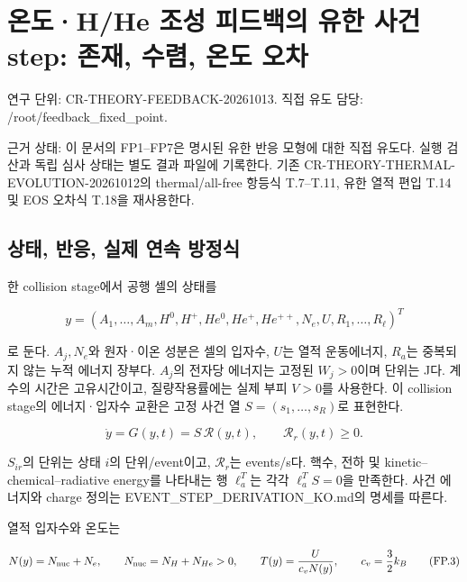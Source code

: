 \hypertarget{uxc628uxb3c4hhe-uxc870uxc131-uxd53cuxb4dcuxbc31uxc758-uxc720uxd55c-uxc0acuxac74-step-uxc874uxc7ac-uxc218uxb834-uxc628uxb3c4-uxc624uxcc28}{%
\section{온도·H/He 조성 피드백의 유한 사건 step: 존재, 수렴, 온도 오차}\label{uxc628uxb3c4hhe-uxc870uxc131-uxd53cuxb4dcuxbc31uxc758-uxc720uxd55c-uxc0acuxac74-step-uxc874uxc7ac-uxc218uxb834-uxc628uxb3c4-uxc624uxcc28}}

연구 단위: CR-THEORY-FEEDBACK-20261013. 직접 유도 담당: /root/feedback\_fixed\_point.

근거 상태: 이 문서의 FP1--FP7은 명시된 유한 반응 모형에 대한 직접 유도다. 실행 검산과 독립 심사 상태는 별도 결과 파일에 기록한다. 기존 CR-THEORY-THERMAL-EVOLUTION-20261012의 thermal/all-free 항등식 T.7--T.11, 유한 열적 편입 T.14 및 EOS 오차식 T.18을 재사용한다.

\hypertarget{uxc0c1uxd0dc-uxbc18uxc751-uxc2e4uxc81c-uxc5f0uxc18d-uxbc29uxc815uxc2dd}{%
\subsection{상태, 반응, 실제 연속 방정식}\label{uxc0c1uxd0dc-uxbc18uxc751-uxc2e4uxc81c-uxc5f0uxc18d-uxbc29uxc815uxc2dd}}

한 collision stage에서 공행 셀의 상태를

\[
y=(A_1,\ldots,A_m,H^0,H^+,He^0,He^+,He^{++},N_e,U,R_1,\ldots,R_\ell)^T
\tag{FP.1}
\]

로 둔다. \(A_j,N_e\)와 원자·이온 성분은 셀의 입자수, \(U\)는 열적 운동에너지, \(R_a\)는 중복되지 않는 누적 에너지 장부다. \(A_j\)의 전자당 에너지는 고정된 \(W_j>0\)이며 단위는 J다. 계수의 시간은 고유시간이고, 질량작용률에는 실제 부피 \(V>0\)를 사용한다. 이 collision stage의 에너지·입자수 교환은 고정 사건 열 \(S=(s_1,\ldots,s_R)\)로 표현한다.

\[
\dot y=G(y,t)=S\,\mathcal R(y,t),\qquad
\mathcal R_r(y,t)\ge0.
\tag{FP.2}
\]

\(S_{ir}\)의 단위는 상태 \(i\)의 단위/event이고, \(\mathcal R_r\)는 events/s다. 핵수, 전하 및 kinetic--chemical--radiative energy를 나타내는 행 \(\ell_a^T\)는 각각 \(\ell_a^TS=0\)을 만족한다. 사건 에너지와 charge 정의는 EVENT\_STEP\_DERIVATION\_KO.md의 명세를 따른다.

열적 입자수와 온도는

\[
N(y)=N_{\rm nuc}+N_e,\qquad
N_{\rm nuc}=N_H+N_{He}>0,\qquad
T(y)=\frac{U}{c_vN(y)},\qquad c_v=\frac32k_B
\tag{FP.3}
\]

